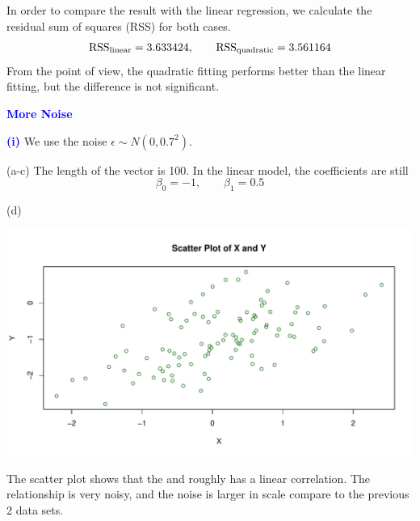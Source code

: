 \documentclass[a4paper,12pt]{article}
\newcommand{\qnum}[1]{\noindent\textcolor{blue}{\textbf{(#1)}}}
\newcommand{\tx}[1]{\text{#1}}
\newcommand{\ba}{\[\begin{aligned}}
\newcommand{\ea}{\end{aligned}\]}
\begin{document}
In order to compare the result with the linear regression, we calculate the residual sum of squares (RSS) for both cases.
\ba 
    \rss_{\tx{linear}} = 3.633424,\qquad 
    \rss_{\tx{quadratic}} = 3.561164
\ea 
From the \rss point of view, the quadratic fitting performs better than the linear fitting, but the difference is not significant.
\bigskip\bigskip



































\noindent\textcolor{blue}{\textbf{More Noise}}\bigskip  

\qnum{i}
We use the noise $\epsilon\sim N(0, 0.7^2)$.

(a-c)
The length of the vector \yr is 100.
In the linear model, the coefficients are still
\[
    \beta_0 = -1,\qquad 
    \beta_1 = 0.5
\]

(d) 
\begin{center}
    \includegraphics[width=0.9\linewidth]{Images/Prob2-Ex13-i-d.pdf}
\end{center}

The scatter plot shows that the \xr and \yr roughly has a linear correlation. The relationship is very noisy, and the noise is larger in scale compare to the previous 2 data sets.
\bigskip
\end{document}
